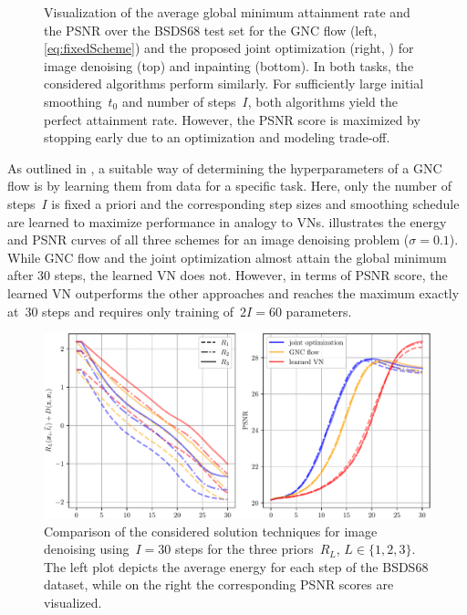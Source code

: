 \documentclass{article}
\theoremstyle{plain}
\theoremstyle{definition}
\theoremstyle{remark}
\begin{document}
\begin{figure}[h!]
\caption{
Visualization of the average global minimum attainment rate and the PSNR over the BSDS68 test set for the GNC flow (left, \eqref{eq:fixedScheme}) and the proposed joint optimization (right, ) for image denoising (top) and inpainting (bottom).
In both tasks, the considered algorithms perform similarly.
For sufficiently large initial smoothing~$t_0$ and number of steps~$I$, both algorithms yield the perfect attainment rate.
However, the PSNR score is maximized by stopping early due to an optimization and modeling trade-off.
}
\label{fig:algComparison}
\end{figure}

As outlined in , a suitable way of determining the hyperparameters of a GNC flow is by learning them from data for a specific task.
Here, only the number of steps~$I$ is fixed a priori and the corresponding step sizes and smoothing schedule are learned to maximize performance in analogy to VNs.
 illustrates the energy and PSNR curves of all three schemes for an image denoising problem ($\sigma=0.1$).
While GNC flow and the joint optimization almost attain the global minimum after $30$ steps, the learned VN does not.
However, in terms of PSNR score, the learned VN outperforms the other approaches and reaches the maximum exactly at~$30$ steps and requires only training of~$2I=60$ parameters.
\begin{figure}
\centering
\includegraphics[width=.9\linewidth]{figures/results/plots_denoise}
\caption{
Comparison of the considered solution techniques for image denoising using~$I=30$ steps for the three priors~$R_L$, $L\in\{1,2,3\}$.
The left plot depicts the average energy for each step of the BSDS68 dataset, while on the right the corresponding PSNR scores are visualized.
}
\label{fig:allThreeComparison}
\end{figure}
\end{document}
